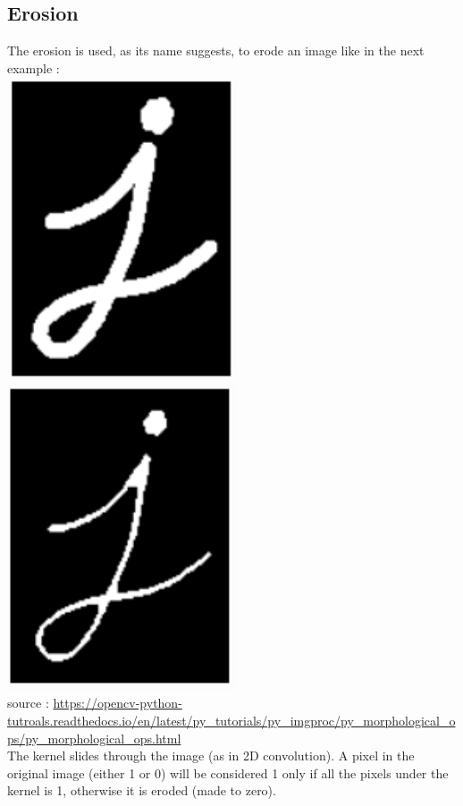 \documentclass{article}
\begin{document}
\subsection{Erosion}

The erosion is used, as its name suggests, to erode an image like in the next example :\\

\includegraphics[width=6.8cm]{images/img12.png} 
\includegraphics[width=6.8cm]{images/img13.png} \\
source : \url{https://opencv-python-tutroals.readthedocs.io/en/latest/py_tutorials/py_imgproc/py_morphological_ops/py_morphological_ops.html}\\

The kernel slides through the image (as in 2D convolution). A pixel in the original image (either 1 or 0) will be considered 1 only if all the pixels under the kernel is 1, otherwise it is eroded (made to zero).
\end{document}
